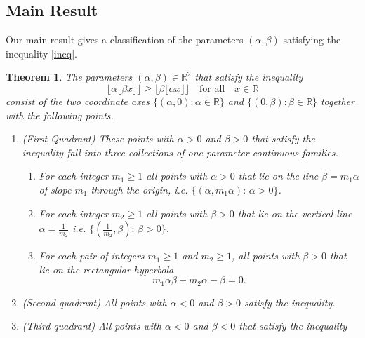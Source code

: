 \documentclass[12pt,letterpaper, reqno]{amsart}
\newtheorem{thm}{Theorem}[section]
\theoremstyle{definition}
\theoremstyle{remark}
\newcommand{\RR}{\ensuremath{\mathbb{R}}}
\newcommand{\QQ}{\mathbb{Q}}
\begin{document}
%
\subsection{Main Result}

Our main result gives a  classification of the parameters $(\alpha, \beta)$
satisfying the inequality \eqref{ineq}.  %

%
%
\begin{thm} \label{thm:main}
The parameters  $(\alpha, \beta) \in \RR^2$  that satisfy the inequality
$$\lfloor \alpha \lfloor \beta x\rfloor \rfloor \geq \lfloor \beta \lfloor \alpha x\rfloor \rfloor
\quad \mbox{for all} \quad x \in \RR
$$
 consist of the two coordinate axes $\{(\alpha, 0): \alpha  \in \RR \}$
and $\{ (0, \beta):  \beta \in \RR\}$ together with  the following points. 
\begin{enumerate}
\item[(i)] 
{\rm (First Quadrant)} These points with  $\alpha>0$ and $\beta >0$ that satisfy
the inequality  fall into three collections of one-parameter continuous families.
\begin{enumerate}
\item[(i-a)] For each integer $m_1 \ge 1$ all points with $\alpha >0$ that lie on the line $\beta= m_1 \alpha$ of slope $m_1$ through the origin,
i.e. $\{ (\alpha, m_1 \alpha): \, \alpha >0\}$.
\item[(i-b)] For each  integer $m_2 \ge 1$ all points with $\beta >0$ that lie on the  vertical line $\alpha= \frac{1}{m_2}$ i.e. 
$\{(\frac{1}{m_2}, \beta): \, \beta >0 \}$.
\item[(i-c)] For each pair of integers $m_1\ge 1$ and $m_2 \ge 1$, all points with $\beta>0$ that lie on the 
rectangular hyperbola
$$m_1 \alpha \beta + m_2 \alpha - \beta =0.$$
\end{enumerate} 
\item[(ii)] {\rm (Second quadrant)} All points with $\alpha <0$ and $\beta >0$ satisfy the inequality.
\item[(iii)] {\rm (Third quadrant)} All points with $\alpha <0$ and $\beta <0$ that satisfy the inequality

\end{enumerate}
\end{thm}
\end{document}

